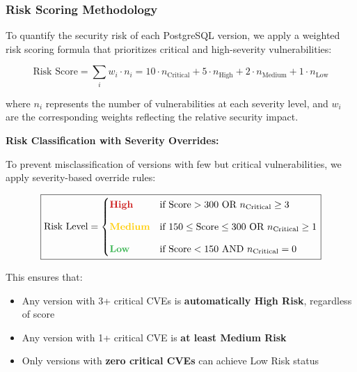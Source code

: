 \documentclass[11pt, a4paper]{article}
\begin{document}
\subsubsection{Risk Scoring Methodology}

To quantify the security risk of each PostgreSQL version, we apply a weighted risk scoring formula that prioritizes critical and high-severity vulnerabilities:

\begin{equation}
\boxed{
\text{Risk Score} = \sum_{i} w_i \cdot n_i = 10 \cdot n_{\text{Critical}} + 5 \cdot n_{\text{High}} + 2 \cdot n_{\text{Medium}} + 1 \cdot n_{\text{Low}}
}
\end{equation}

\noindent where $n_i$ represents the number of vulnerabilities at each severity level, and $w_i$ are the corresponding weights reflecting the relative security impact.

\vspace{0.3cm}

\noindent\textbf{Risk Classification with Severity Overrides:}

To prevent misclassification of versions with few but critical vulnerabilities, we apply severity-based override rules:

\begin{equation}
\boxed{
\text{Risk Level} = 
\begin{cases}
\textcolor{vuln-critical}{\textbf{High}} & \text{if } \text{Score} > 300 \text{ OR } n_{\text{Critical}} \geq 3 \\[0.3cm]
\textcolor{vuln-medium}{\textbf{Medium}} & \text{if } 150 \leq \text{Score} \leq 300 \text{ OR } n_{\text{Critical}} \geq 1 \\[0.3cm]
\textcolor{gantt-supported}{\textbf{Low}} & \text{if } \text{Score} < 150 \text{ AND } n_{\text{Critical}} = 0
\end{cases}
}
\end{equation}

\vspace{0.2cm}

\noindent This ensures that:
\begin{itemize}
    \item Any version with 3+ critical CVEs is \textbf{automatically High Risk}, regardless of score
    \item Any version with 1+ critical CVE is \textbf{at least Medium Risk}
    \item Only versions with \textbf{zero critical CVEs} can achieve Low Risk status
\end{itemize}
\end{document}
